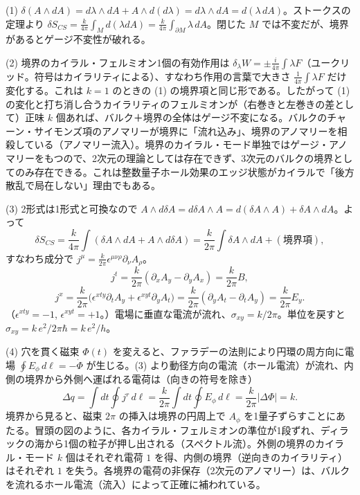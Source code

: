 \begin{solution}
(1) $\delta(A\wedge dA)=d\lambda\wedge dA+A\wedge d(d\lambda)=d\lambda\wedge dA=d(\lambda\,dA)$。ストークスの定理より $\delta S_{CS}=\frac k{4\pi}\int_M d(\lambda dA)=\frac{k}{4\pi}\int_{\partial M}\lambda\,dA$。閉じた $M$ では不変だが、境界があるとゲージ不変性が破れる。

(2) 境界のカイラル・フェルミオン1個の有効作用は $\delta_\lambda W=\pm\frac{i}{4\pi}\int\lambda F$（ユークリッド。符号はカイラリティによる）、すなわち作用の言葉で大きさ $\frac1{4\pi}\int\lambda F$ だけ変化する。これは $k=1$ のときの (1) の境界項と同じ形である。したがって (1) の変化と打ち消し合うカイラリティのフェルミオンが（右巻きと左巻きの差として）正味 $k$ 個あれば、バルク＋境界の全体はゲージ不変になる。バルクのチャーン・サイモンズ項のアノマリーが境界に「流れ込み」、境界のアノマリーを相殺している（アノマリー流入）。境界のカイラル・モード単独ではゲージ・アノマリーをもつので、2次元の理論としては存在できず、3次元のバルクの境界としてのみ存在できる。これは整数量子ホール効果のエッジ状態がカイラルで「後方散乱で局在しない」理由でもある。

(3) 2形式は1形式と可換なので $A\wedge d\delta A=d\delta A\wedge A=d(\delta A\wedge A)+\delta A\wedge dA$。よって
\[
\delta S_{CS}=\frac{k}{4\pi}\int(\delta A\wedge dA+A\wedge d\delta A)=\frac{k}{2\pi}\int\delta A\wedge dA+(\text{境界項}),
\]
すなわち成分で $j^\mu=\frac{k}{2\pi}\epsilon^{\mu\nu\rho}\partial_\nu A_\rho$。
\[
j^t=\frac{k}{2\pi}(\partial_xA_y-\partial_yA_x)=\frac{k}{2\pi}B,
\]
\[
j^x=\frac{k}{2\pi}\bigl(\epsilon^{xty}\partial_tA_y+\epsilon^{xyt}\partial_yA_t\bigr)=\frac{k}{2\pi}(\partial_yA_t-\partial_tA_y)=\frac{k}{2\pi}E_y .
\]
（$\epsilon^{xty}=-1$, $\epsilon^{xyt}=+1$。）電場に垂直な電流が流れ、$\sigma_{xy}=k/2\pi$。単位を戻すと $\sigma_{xy}=k\,e^2/2\pi\hbar=k\,e^2/h$。

(4) 穴を貫く磁束 $\Phi(t)$ を変えると、ファラデーの法則により円環の周方向に電場 $\oint E_\phi\,d\ell=-\dot\Phi$ が生じる。(3) より動径方向の電流（ホール電流）が流れ、内側の境界から外側へ運ばれる電荷は（向きの符号を除き）
\[
\Delta q=\int dt\oint j^r\,d\ell=\frac{k}{2\pi}\int dt\oint E_\phi\,d\ell=\frac{k}{2\pi}\lvert\Delta\Phi\rvert=k .
\]
境界から見ると、磁束 $2\pi$ の挿入は境界の円周上で $A_\phi$ を1量子ずらすことにあたる。冒頭の図のように、各カイラル・フェルミオンの準位が1段ずれ、ディラックの海から1個の粒子が押し出される（スペクトル流）。外側の境界のカイラル・モード $k$ 個はそれぞれ電荷 $1$ を得、内側の境界（逆向きのカイラリティ）はそれぞれ $1$ を失う。各境界の電荷の非保存（2次元のアノマリー）は、バルクを流れるホール電流（流入）によって正確に補われている。
\end{solution}
